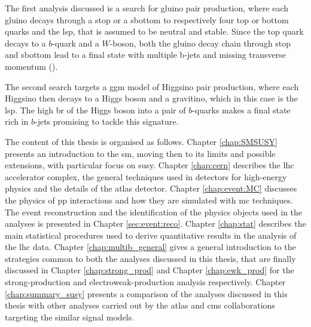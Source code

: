 The first analysis discussed is a search for gluino pair production, where each gluino decays through a stop or a sbottom 
to respectively four top or bottom quarks and the \gls{lsp}, that is assumed to be neutral and stable.
Since the top quark decays to a $b$-quark and a $W$-boson, both the gluino decay chain through stop and sbottom lead to a 
final state with multiple b-jets and missing transverse momentum (\met). 

The second search targets a \gls{ggm} model of Higgsino pair production, where each Higgsino then decays to a Higgs boson and 
a gravitino, which in this case is the \gls{lsp}. The high \gls{br} of the Higgs boson into a pair of $b$-quarks makes a final state 
rich in $b$-jets promising to tackle this signature.

The content of this thesis is organised as follows. Chapter \ref{chap:SMSUSY} presents an introduction to the \gls{sm}, 
moving then to its limits and possible extensions, with particular focus on \gls{susy}. 
Chapter \ref{chap:cern} describes the \gls{lhc} accelerator complex, the general techniques used in detectors 
for high-energy physics and the details of the \gls{atlas} detector. 
Chapter \ref{chap:event:MC} discusses the physics of \gls{pp} interactions and how they are simulated with \gls{mc} techniques. 
The event reconstruction and the identification of the physics objects used in the analyses is presented in Chapter \ref{sec:event:reco}. 
Chapter \ref{chap:stat} describes the main statistical procedures used to derive quantitative results in the analysis of the \gls{lhc} data.
Chapter \ref{chap:multib_general} gives a general introduction to the strategies common to both the analyses discussed in this thesis, 
that are finally discussed in Chapter \ref{chap:strong_prod} and Chapter \ref{chap:ewk_prod} for the strong-production and 
electroweak-production analysis respectively. 
Chapter \ref{chap:summary_susy} presents a comparison of the analyses discussed in this thesis with other analyses carried out 
by the \gls{atlas} and \gls{cms} collaborations targeting the similar signal models. 
